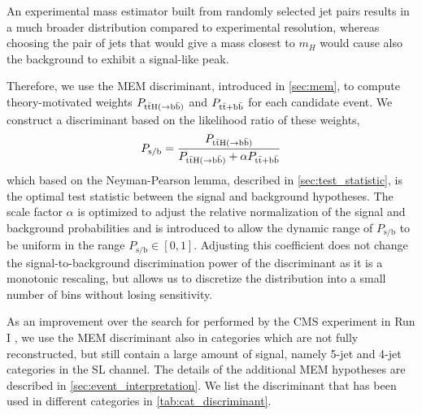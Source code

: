 An experimental mass estimator built from randomly selected jet pairs results in a much broader distribution compared to experimental resolution, whereas choosing the pair of jets that would give a mass closest to $m_H$ would cause also the background to exhibit a signal-like peak.

Therefore, we use the MEM discriminant, introduced in \cref{sec:mem}, to compute theory-motivated weights $P_{\mathrm{t} \bar{\mathrm{t}} \mathrm{H} (\rightarrow \mathrm{b}\bar{\mathrm{b}})}$ and $P_{\mathrm{t} \bar{\mathrm{t}} + \mathrm{b}\bar{\mathrm{b}}}$ for each candidate event. We construct a discriminant based on the likelihood ratio of these weights,
\begin{equation}
\label{eq:mem_ratio}
P_{\mathrm{s}/\mathrm{b}} = \frac{P_{\mathrm{t} \bar{\mathrm{t}} \mathrm{H} (\rightarrow \mathrm{b}\bar{\mathrm{b}})}}{P_{\mathrm{t} \bar{\mathrm{t}} \mathrm{H} (\rightarrow \mathrm{b}\bar{\mathrm{b}})} + \alpha P_{\mathrm{t} \bar{\mathrm{t}} + \mathrm{b}\bar{\mathrm{b}}}}
\end{equation} 
which based on the Neyman-Pearson lemma, described in \cref{sec:test_statistic}, is the optimal test statistic between the signal and background hypotheses. The scale factor $\alpha$ is optimized to adjust the relative normalization of the signal and background probabilities and is introduced to allow the dynamic range of $P_{\mathrm{s}/\mathrm{b}}$ to be uniform in the range $P_{\mathrm{s}/\mathrm{b}} \in [0, 1]$. Adjusting this coefficient does not change the signal-to-background discrimination power of the discriminant as it is a monotonic rescaling, but allows us to discretize the distribution into a small number of bins without losing sensitivity.

As an improvement over the search for \ttHbb performed by the CMS experiment in Run I \cite{Khachatryan:2015ila}, we use the MEM discriminant also in categories which are not fully reconstructed, but still contain a large amount of signal, namely 5-jet and 4-jet categories in the SL channel. The details of the additional MEM hypotheses are described in \cref{sec:event_interpretation}. We list the discriminant that has been used in different categories in \cref{tab:cat_discriminant}. 


